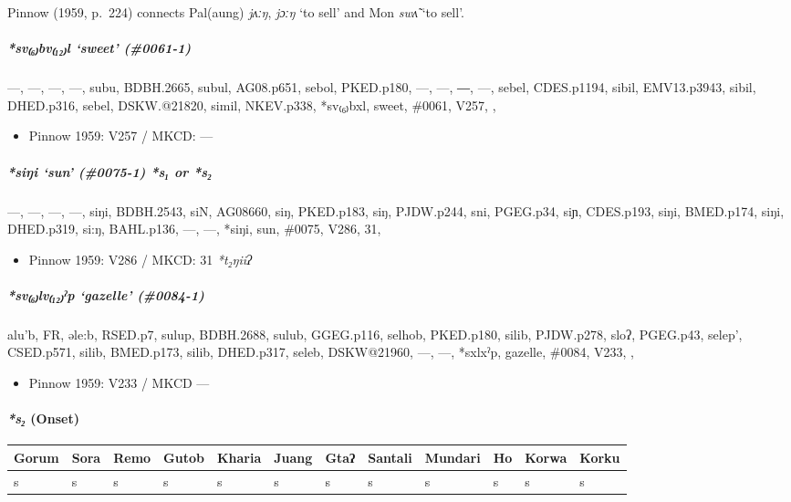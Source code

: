 \documentclass[a4paper,]{article}
\providecommand{\tightlist}{%
  \setlength{\itemsep}{0pt}\setlength{\parskip}{0pt}}
\let\oldparagraph\paragraph
\renewcommand{\paragraph}[1]{\oldparagraph{#1}\mbox{}}
\let\oldsubparagraph\subparagraph
\renewcommand{\subparagraph}[1]{\oldsubparagraph{#1}\mbox{}}
\begin{document}
Pinnow (1959, p.~224) connects Pal(aung) \emph{jʌːŋ}, \emph{jɔːŋ} `to
sell' and Mon \emph{swʌ̃} `to sell'.

\subparagraph{\texorpdfstring{\emph{*sv₍₆₎bv₍₁₂₎l} `sweet'
(\#0061-1)}{*sv₍₆₎bv₍₁₂₎l sweet (\#0061-1)}}\label{svbvl-sweet-0061-1}

---, ---, ---, ---, subu, BDBH.2665, subul, AG08.p651, sebol, PKED.p180,
---, ---, ―, ---, sebel, CDES.p1194, sibil, EMV13.p3943, sibil,
DHED.p316, sebel, DSKW.@21820, simil, NKEV.p338, *sv₍₆₎bxl, sweet,
\#0061, V257, ,

\begin{itemize}
\tightlist
\item
  Pinnow 1959: V257 / MKCD: ---
\end{itemize}

\subparagraph{\texorpdfstring{\emph{*siŋi} `sun' (\#0075-1) \emph{*s₁}
or
\emph{*s₂}}{*siŋi sun (\#0075-1) *s₁ or *s₂}}\label{siux14bi-sun-0075-1-s-or-s}

---, ---, ---, ---, siŋi, BDBH.2543, siN, AG08660, siŋ, PKED.p183, siŋ,
PJDW.p244, sni, PGEG.p34, siɲ, CDES.p193, siŋi, BMED.p174, siŋi,
DHED.p319, si:ŋ, BAHL.p136, ---, ---, *siŋi, sun, \#0075, V286, 31,

\begin{itemize}
\tightlist
\item
  Pinnow 1959: V286 / MKCD: 31 \emph{*t₂ŋiiʔ}
\end{itemize}

\subparagraph{\texorpdfstring{\emph{*sv₍₆₎lv₍₁₂₎ˀp} `gazelle'
(\#0084-1)}{*sv₍₆₎lv₍₁₂₎ˀp gazelle (\#0084-1)}}\label{svlvux2c0p-gazelle-0084-1}

alu'b, FR, əle:b, RSED.p7, sulup, BDBH.2688, sulub, GGEG.p116, selhob,
PKED.p180, silib, PJDW.p278, sloʔ, PGEG.p43, selep', CSED.p571, silib,
BMED.p173, silib, DHED.p317, seleb, DSKW@21960, ---, ---, *sxlxˀp,
gazelle, \#0084, V233, ,

\begin{itemize}
\tightlist
\item
  Pinnow 1959: V233 / MKCD ---
\end{itemize}

\paragraph{\texorpdfstring{\emph{*s₂}
(Onset)}{*s₂ (Onset)}}\label{s-onset-1}

\begin{longtable}[]{@{}llllllllllll@{}}
\toprule
Gorum & Sora & Remo & Gutob & Kharia & Juang & Gtaʔ & Santali & Mundari
& Ho & Korwa & Korku\tabularnewline
\midrule
\endhead
s & s & s & s & s & s & s & s & s & s & s & s\tabularnewline
\bottomrule
\end{longtable}
\end{document}
